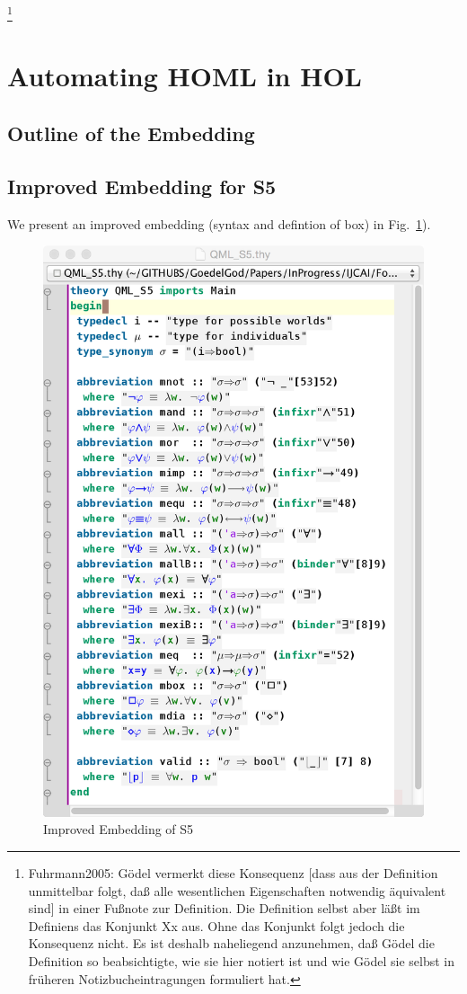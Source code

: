\documentclass{article}
\begin{document}
\footnote{Fuhrmann2005: Gödel vermerkt diese Konsequenz [dass aus der Definition unmittelbar folgt, daß alle wesentlichen
Eigenschaften notwendig äquivalent sind] in einer Fußnote zur Definition. Die Definition selbst aber läßt im Definiens das Konjunkt Xx aus. Ohne das Konjunkt folgt jedoch die Konsequenz nicht. Es ist deshalb naheliegend anzunehmen, daß Gödel die Definition so beabsichtigte, wie sie hier notiert ist und wie Gödel sie selbst in früheren Notizbucheintragungen formuliert hat.}





\section{Automating HOML in HOL}
\subsection{Outline of the Embedding}
\subsection{Improved Embedding for S5}
We present an improved embedding (syntax and defintion of box) in  Fig.~\ref{QMLS5}).
\begin{figure}
\centerline{\includegraphics[width=\columnwidth]{./Images/QMLS5.png}}
\caption{Improved Embedding of S5} \label{QMLS5}
\end{figure}
\end{document}
